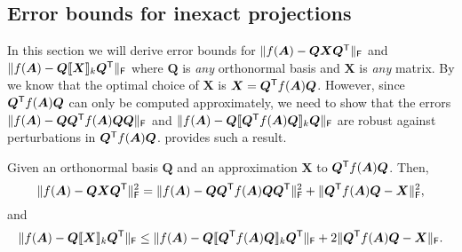 \subsection{Error bounds for inexact projections}\label{section:inexact_projections}
In this section we will derive error bounds for $\|f(\bm{A}) - \bm{Q} \bm{X} \bm{Q}^{\textsf{\textup{T}}}\|_{\textsf{\textup{F}}}$ and $\|f(\bm{A}) - \bm{Q} \llbracket \bm{X} \rrbracket_k \bm{Q}^{\textsf{\textup{T}}}\|_{\textsf{\textup{F}}}$ where $\bm{Q}$ is \textit{any} orthonormal basis and $\bm{X}$ is \textit{any} matrix. By \cite[Lemma 3.3]{funnystrom2} we know that the optimal choice of $\bm{X}$ is $\bm{X} = \bm{Q}^{\textsf{\textup{T}}} f(\bm{A}) \bm{Q}$. However, since $\bm{Q}^{\textsf{\textup{T}}} f(\bm{A}) \bm{Q}$ can only be computed approximately, we need to show that the errors $\|f(\bm{A}) - \bm{Q} \bm{Q}^{\textsf{\textup{T}}} f(\bm{A}) \bm{Q} \bm{Q}\|_{\textsf{\textup{F}}}$ and $\|f(\bm{A}) - \bm{Q} \llbracket \bm{Q}^{\textsf{\textup{T}}} f(\bm{A}) \bm{Q} \rrbracket_k \bm{Q}\|_{\textsf{\textup{F}}}$ are robust against perturbations in $\bm{Q}^{\textsf{\textup{T}}} f(\bm{A}) \bm{Q}$.  provides such a result. 
\begin{theorem}\label{theorem:robust}
    Given an orthonormal basis $\bm{Q}$ and an approximation $\bm{X}$ to $\bm{Q}^{\textsf{\textup{T}}} f(\bm{A}) \bm{Q}$. Then,
    \begin{equation}\label{eq:robustness1}
        \|f(\bm{A}) - \bm{Q} \bm{X}\bm{Q}^{\textsf{\textup{T}}}\|_{\textsf{\textup{F}}}^2 = \|f(\bm{A}) - \bm{Q}\bm{Q}^{\textsf{\textup{T}}} f(\bm{A})\bm{Q}\bm{Q}^{\textsf{\textup{T}}}\|_{\textsf{\textup{F}}}^2 + \|\bm{Q}^{\textsf{\textup{T}}} f(\bm{A})\bm{Q} - \bm{X}\|_{\textsf{\textup{F}}}^2,
    \end{equation}
    and
    \begin{equation}\label{eq:robustness2}
        \|f(\bm{A}) - \bm{Q} \llbracket \bm{X} \rrbracket_k \bm{Q}^{\textsf{\textup{T}}}\|_{\textsf{\textup{F}}} \leq \|f(\bm{A}) - \bm{Q}\llbracket\bm{Q}^{\textsf{\textup{T}}} f(\bm{A})\bm{Q} \rrbracket_k\bm{Q}^{\textsf{\textup{T}}}\|_{\textsf{\textup{F}}} + 2\|\bm{Q}^{\textsf{\textup{T}}} f(\bm{A})\bm{Q} - \bm{X}\|_{\textsf{\textup{F}}}.
    \end{equation}
\end{theorem}
